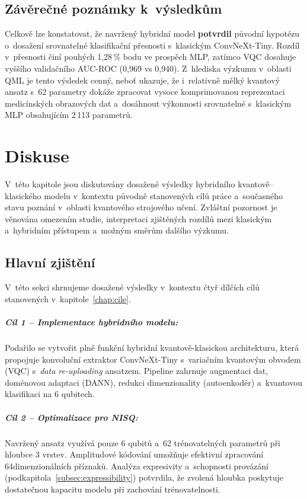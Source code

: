 \documentclass[12pt, a4paper]{report}
\begin{document}
\section{Závěrečné poznámky k~výsledkům}
Celkově lze konstatovat, že navržený hybridní model \textbf{potvrdil} původní hypotézu o~dosažení srovnatelné klasifikační přesnosti s~klasickým ConvNeXt-Tiny. Rozdíl v~přesnosti činí pouhých 1{,}28\,\% bodu ve prospěch MLP, zatímco VQC dosahuje vyššího validačního AUC-ROC (0{,}969 vs 0{,}940). Z~hlediska výzkumu v~oblasti QML je tento výsledek cenný, neboť ukazuje, že i~relativně mělký kvantový ansatz s~62 parametry dokáže zpracovat vysoce komprimovanou reprezentaci medicínských obrazových dat a~dosáhnout výkonnosti srovnatelné s~klasickým MLP obsahujícím 2\,113 parametrů. 

\chapter{Diskuse} \label{chap:diskuse}

V~této kapitole jsou diskutovány dosažené výsledky hybridního kvantově–klasického modelu v~kontextu původně stanovených cílů práce a~současného stavu poznání v~oblasti kvantového strojového učení. Zvláštní pozornost je věnována omezením studie, interpretaci zjištěných rozdílů mezi klasickým a~hybridním přístupem a~možným směrům dalšího výzkumu.

\section{Hlavní zjištění}

V~této sekci shrnujeme dosažené výsledky v~kontextu čtyř dílčích cílů stanovených v~kapitole~\ref{chap:cile}.

\paragraph{Cíl 1 -- Implementace hybridního modelu:} Podařilo se vytvořit plně funkční hybridní kvantově-klasickou architekturu, která propojuje konvoluční extraktor ConvNeXt-Tiny s~variačním kvantovým obvodem (VQC) s~\textit{data re-uploading} ansatzem. Pipeline zahrnuje augmentaci dat, doménovou adaptaci (DANN), redukci dimenzionality (autoenkodér) a~kvantovou klasifikaci na 6 qubitech.

\paragraph{Cíl 2 -- Optimalizace pro NISQ:} Navržený ansatz využívá pouze 6 qubitů a~62 trénovatelných parametrů při hloubce 3 vrstev. Amplitudové kódování umožňuje efektivní zpracování 64dimenzionálních příznaků. Analýza expresivity a~schopnosti provázání (podkapitola~\ref{subsec:expressibility}) potvrdila, že zvolená hloubka poskytuje dostatečnou kapacitu modelu při zachování trénovatelnosti.
\end{document}
